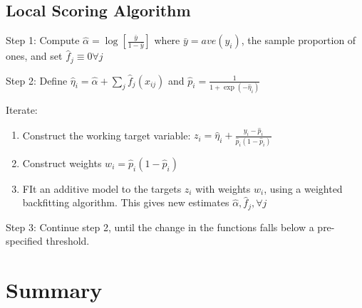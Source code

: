 \documentclass[
]{book}
\providecommand{\tightlist}{%
  \setlength{\itemsep}{0pt}\setlength{\parskip}{0pt}}
\begin{document}
\hypertarget{local-scoring-algorithm}{%
\subsection{Local Scoring Algorithm}\label{local-scoring-algorithm}}

Step 1: Compute \(\hat{\alpha} = \log [\frac{\bar{y}}{1- \bar{y}}]\) where \(\bar{y} = ave(y_i)\), the sample proportion of ones, and set \(\hat{f}_j\equiv 0 \forall j\)

Step 2: Define \(\hat{\eta}_i = \hat{\alpha} + \sum_j \hat{f}_j(x_{ij})\) and \(\hat{p}_i = \frac{1}{1 + \exp(-\hat{\eta}_i)}\)

Iterate:

\begin{enumerate}
\def\labelenumi{\arabic{enumi}.}
\tightlist
\item
  Construct the working target variable: \(z_i = \hat{\eta}_i + \frac{y_i - \hat{p}_i}{\hat{p}_i(1-\hat{p}_i)}\)
\item
  Construct weights \(w_i = \hat{p}_i (1-\hat{p}_i)\)
\item
  FIt an additive model to the targets \(z_i\) with weights \(w_i\), using a weighted backfitting algorithm. This gives new estimates \(\hat{\alpha}, \hat{f}_j, \forall j\)
\end{enumerate}

Step 3: Continue step 2, until the change in the functions falls below a pre-specified threshold.

\hypertarget{summary}{%
\section{Summary}\label{summary}}
\end{document}
